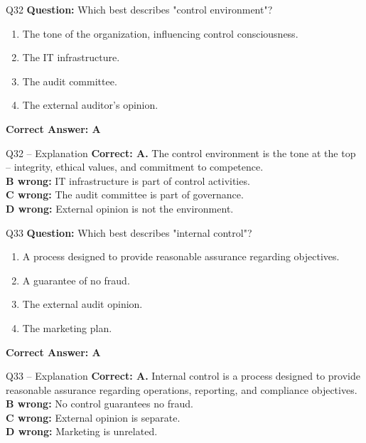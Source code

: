 \documentclass[aspectratio=169,10pt]{beamer}
\begin{document}
	\begin{frame}[t]{Q32}
		\small
		\textbf{Question:} Which best describes "control environment"?
		\begin{enumerate}[label=\Alph*.,itemsep=1pt,topsep=2pt]
			\item The tone of the organization, influencing control consciousness.
			\item The IT infrastructure.
			\item The audit committee.
			\item The external auditor's opinion.
		\end{enumerate}
		\vspace{4pt}
		\textbf{Correct Answer: A}
	\end{frame}
	
	\begin{frame}[t]{Q32 -- Explanation}
		\small
		\textbf{Correct: A.} The control environment is the tone at the top -- integrity, ethical values, and commitment to competence. \\[4pt]
		\textbf{B wrong:} IT infrastructure is part of control activities. \\[2pt]
		\textbf{C wrong:} The audit committee is part of governance. \\[2pt]
		\textbf{D wrong:} External opinion is not the environment.
	\end{frame}
	
	\begin{frame}[t]{Q33}
		\small
		\textbf{Question:} Which best describes "internal control"?
		\begin{enumerate}[label=\Alph*.,itemsep=1pt,topsep=2pt]
			\item A process designed to provide reasonable assurance regarding objectives.
			\item A guarantee of no fraud.
			\item The external audit opinion.
			\item The marketing plan.
		\end{enumerate}
		\vspace{4pt}
		\textbf{Correct Answer: A}
	\end{frame}
	
	\begin{frame}[t]{Q33 -- Explanation}
		\small
		\textbf{Correct: A.} Internal control is a process designed to provide reasonable assurance regarding operations, reporting, and compliance objectives. \\[4pt]
		\textbf{B wrong:} No control guarantees no fraud. \\[2pt]
		\textbf{C wrong:} External opinion is separate. \\[2pt]
		\textbf{D wrong:} Marketing is unrelated.
	\end{frame}
	
\end{document}
